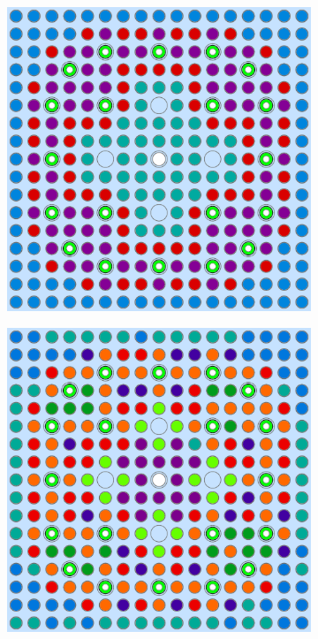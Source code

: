 \begin{figure}[h!]
\begin{subfigure}{0.47\textwidth}
  \caption{}
  \label{fig:chap10-assm-31-20BPs-pinch-4}
\end{subfigure}%
\begin{subfigure}{0.47\textwidth}
  \centering
  \includegraphics[width=0.9\linewidth]{figures/unsupervised/geometries/with-features/4-clusters/combined/assm-31-20BPs}
  \caption{}
  \label{fig:chap10-assm-31-20BPs-combined-4}
\end{subfigure}
\begin{subfigure}{0.47\textwidth}
  \centering
  \includegraphics[width=0.9\linewidth]{figures/unsupervised/geometries/with-features/8-clusters/pinch/assm-31-20BPs}

\end{subfigure}
\end{figure}
